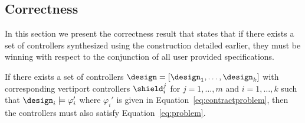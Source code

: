 \subsection{Correctness}
In this section we present the correctness result that states that if there exists a set of controllers  synthesized using the construction detailed earlier, they must be winning with respect to the conjunction of all user provided specifications.  
\begin{thm}
If there exists a set of controllers $\design = [ \design_1,  \dots, \design_k ]$ with corresponding vertiport controllers $\shield^j_i$ for $j=1,\dots,m$ and $i=1,\dots,k$ such that $\design_i \models \varphi_i'$  where $\varphi_i'$ is given in Equation~\eqref{eq:contractproblem}, then the controllers must also satisfy Equation~\eqref{eq:problem}. 
\end{thm}


